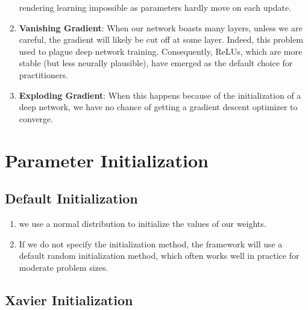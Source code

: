 \begin{enumerate}[itemsep=0.2cm]
\begin{enumerate}
    \end{enumerate}
    rendering learning impossible as parameters hardly move on each update.

    \item \textbf{Vanishing Gradient}: When our network boasts many layers, unless we are careful, the gradient will likely be cut off at some layer. Indeed, this problem used to plague deep network training. Consequently, ReLUs, which are more stable (but less neurally plausible), have emerged as the default choice for practitioners.

    \item \textbf{Exploding Gradient}: When this happens because of the initialization of a deep network, we have no chance of getting a gradient descent optimizer to converge.

\end{enumerate}


\section{Parameter Initialization \cite{dnn-1}} \label{Parameter Initialization}

\subsection{Default Initialization \cite{dnn-1}} \label{Parameter Initialization: Default Initialization}

\begin{enumerate}
    \item we use a normal distribution to initialize the values of our weights. 
    
    \item If we do not specify the initialization method, the framework will use a default random initialization method, which often works well in practice for moderate problem sizes.

\end{enumerate}


\subsection{Xavier Initialization \cite{dnn-1}} \label{Parameter Initialization: Xavier Initialization}

